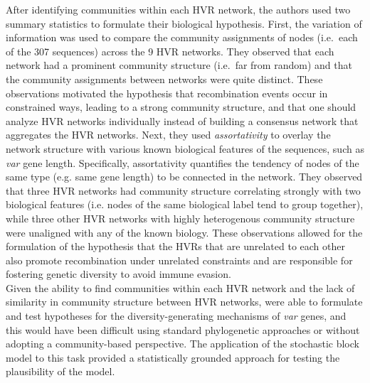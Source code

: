 \indent After identifying communities within each HVR network, the authors used two summary statistics to formulate their biological hypothesis. First, the variation of information \citep{VI} was used to compare the community assignments of nodes (i.e.\ each of the 307 sequences) across the 9 HVR networks. They observed that each network had a prominent community structure (i.e.\ far from random) and that the community assignments between networks were quite distinct. These observations motivated the hypothesis that recombination events occur in constrained ways, leading to a strong community structure, and that one should analyze HVR networks individually instead of building a consensus network that aggregates the HVR networks.  Next, they used \emph{assortativity} \cite{newmanAssort} to overlay the network structure with various known biological features of the sequences, such as  \emph{var} gene length. Specifically, assortativity quantifies the tendency of nodes of the same type (e.g. same gene length) to be connected in the network. They observed that three HVR networks had community structure correlating strongly with two biological features (i.e. nodes of the same biological label tend to group together), while three other HVR networks with highly heterogenous community structure were unaligned with any of the known biology. These observations allowed for the formulation of the hypothesis that the HVRs that are unrelated to each other also promote recombination under unrelated constraints and are responsible for fostering genetic diversity to avoid immune evasion. \\

\indent Given the ability to find communities within each HVR network and the lack of similarity in community structure between HVR networks, \cite{larremoreparasite} were able to formulate and test hypotheses for the diversity-generating mechanisms of \emph{var} genes, and this would have been difficult using standard phylogenetic approaches or without adopting a community-based perspective. The application of the stochastic block model to this task provided a statistically grounded approach for testing the plausibility of the model.

